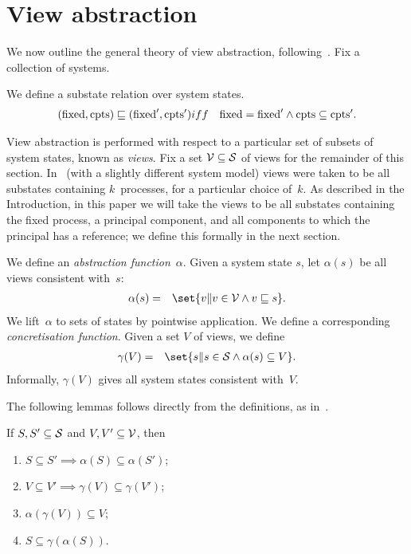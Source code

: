 \section{View abstraction}
\label{sec:view-abstraction}

We now outline the general theory of view abstraction, following~\cite{AHH}.
Fix a collection of systems. 

We define a substate relation over system states.
\begin{eqnarray*}
(\fixed, \cpt ) \sqle (\fixed', \cpt') & iff & 
  \fixed = \fixed' \land \cpt \subseteq \cpt' .
\end{eqnarray*}


View abstraction is performed with respect to a particular set of subsets of
system states, known as \emph{views}.  Fix a set $\V \subseteq \S$ of views
for the remainder of this section.  In~\cite{AHH} (with a slightly different
system model) views were taken to be all substates containing $k$~processes,
for a particular choice of~$k$.  As described in the Introduction, in this
paper we will take the views to be all substates containing the fixed process,
a principal component, and all components to which the principal has a
reference; we define this formally in the next section.

We define an \emph{abstraction function}~$\alpha$.  Given a system state $s$,
let $\alpha(s)$ be all views consistent with~$s$:
%
\begin{eqnarray*}
\alpha(s) & = &
  \set{ v \| v \in \V \land v \sqle s}.
\end{eqnarray*}
%
We lift~$\alpha$ to sets of states by pointwise application. 
%
We define a corresponding \emph{concretisation function}.
Given a set $V$ of views, we define
%
\begin{eqnarray*}
\gamma(V) & = &   \set{ s \| s \in \S \land \alpha(s) \subseteq V }.
\end{eqnarray*}
%
Informally, $\gamma(V)$ gives all system states consistent with~$V$. 

The following lemmas follows directly from the definitions, as in~\cite{AHH}.
% 
\begin{lemma}
If $S, S' \subseteq \S$ and $V, V' \subseteq \V$, then
\begin{enumerate}
\item $S \subseteq S' \implies \alpha(S) \subseteq \alpha(S')$;

\item $V \subseteq V' \implies \gamma(V) \subseteq \gamma(V')$;

\item $\alpha(\gamma(V)) \subseteq V$;

\item $S \subseteq \gamma(\alpha(S))$.
\end{enumerate}
\end{lemma}
%

